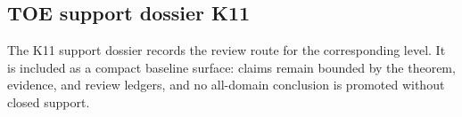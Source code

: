 \subsection{TOE support dossier K11}
The K11 support dossier records the review route for the corresponding level. It is included as a compact baseline surface: claims remain bounded by the theorem, evidence, and review ledgers, and no all-domain conclusion is promoted without closed support.
